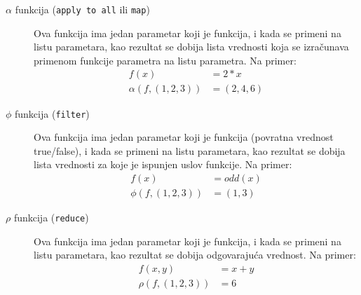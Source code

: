 \documentclass[../main.tex]{subfiles}
\begin{document}
	   \begin{description}
	   \item[$\alpha$ funkcija (\texttt{apply to all} ili \texttt{map})] \hfill
	   
	   Ova funkcija ima jedan parametar koji je funkcija, i kada se primeni na listu parametara, kao rezultat se dobija lista vrednosti koja se izračunava primenom funkcije parametra na listu parametra. Na primer:
	   \begin{align*}
	   f(x)&=2*x\\
	   \alpha(f, (1,2,3))&=(2,4,6)
	   \end{align*}
	   \item[$\phi$ funkcija (\texttt{filter})] \hfill
	   
	   Ova funkcija ima jedan parametar koji je funkcija (povratna vrednost true/false), i kada se primeni na listu parametara, kao rezultat se dobija lista vrednosti za koje je ispunjen uslov funkcije. Na primer:
	   \begin{align*}
	   f(x)&=odd(x)\\
	   \phi(f, (1,2,3))&=(1,3)
	   \end{align*}
	   
	   \item[$\rho$ funkcija (\texttt{reduce})] \hfill
	   
	   Ova funkcija ima jedan parametar koji je funkcija, i kada se primeni na listu parametara, kao rezultat se dobija odgovarajuća vrednost. Na primer:
	   \begin{align*}
	   f(x,y)&=x+y\\
	   \rho(f, (1,2,3))&=6
	   \end{align*}
	   \end{description}
	   
\end{document}
